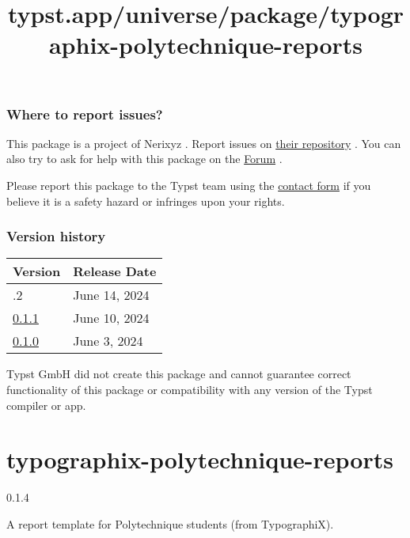 \subsubsection{Where to report issues?}\label{where-to-report-issues}

This package is a project of Nerixyz . Report issues on
\href{https://github.com/Nerixyz/icu-typ}{their repository} . You can
also try to ask for help with this package on the
\href{https://forum.typst.app}{Forum} .

Please report this package to the Typst team using the
\href{https://typst.app/contact}{contact form} if you believe it is a
safety hazard or infringes upon your rights.

\label{versions}
\subsubsection{Version history}\label{version-history}

\begin{longtable}[]{@{}ll@{}}
\toprule\noalign{}
Version & Release Date \\
\midrule\noalign{}
\endhead
\bottomrule\noalign{}
\endlastfoot
0.1.2 & June 14, 2024 \\
\href{https://typst.app/universe/package/icu-datetime/0.1.1/}{0.1.1} &
June 10, 2024 \\
\href{https://typst.app/universe/package/icu-datetime/0.1.0/}{0.1.0} &
June 3, 2024 \\
\end{longtable}

Typst GmbH did not create this package and cannot guarantee correct
functionality of this package or compatibility with any version of the
Typst compiler or app.


\title{typst.app/universe/package/typographix-polytechnique-reports}

\label{banner}
\label{template-thumbnail}

\section{typographix-polytechnique-reports}\label{typographix-polytechnique-reports}

{ 0.1.4 }

A report template for Polytechnique students (from TypographiX).

